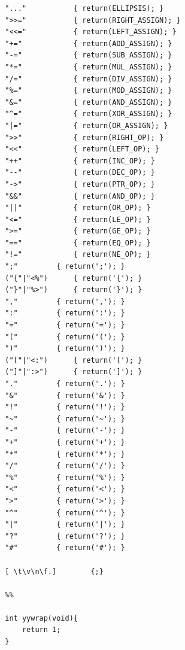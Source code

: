 \documentclass{article}
\begin{document}
\begin{lstlisting}
		"..."			{ return(ELLIPSIS); }
		">>="			{ return(RIGHT_ASSIGN); }
		"<<="			{ return(LEFT_ASSIGN); }
		"+="			{ return(ADD_ASSIGN); }
		"-="			{ return(SUB_ASSIGN); }
		"*="			{ return(MUL_ASSIGN); }
		"/="			{ return(DIV_ASSIGN); }
		"%="			{ return(MOD_ASSIGN); }
		"&="			{ return(AND_ASSIGN); }
		"^="			{ return(XOR_ASSIGN); }
		"|="			{ return(OR_ASSIGN); }
		">>"			{ return(RIGHT_OP); }
		"<<"			{ return(LEFT_OP); }
		"++"			{ return(INC_OP); }
		"--"			{ return(DEC_OP); }
		"->"			{ return(PTR_OP); }
		"&&"			{ return(AND_OP); }
		"||"			{ return(OR_OP); }
		"<="			{ return(LE_OP); }
		">="			{ return(GE_OP); }
		"=="			{ return(EQ_OP); }
		"!="			{ return(NE_OP); }
		";"			{ return(';'); }
		("{"|"<%")		{ return('{'); }
		("}"|"%>")		{ return('}'); }
		","			{ return(','); }
		":"			{ return(':'); }
		"="			{ return('='); }
		"("			{ return('('); }
		")"			{ return(')'); }
		("["|"<:")		{ return('['); }
		("]"|":>")		{ return(']'); }
		"."			{ return('.'); }
		"&"			{ return('&'); }
		"!"			{ return('!'); }
		"~"			{ return('~'); }
		"-"			{ return('-'); }
		"+"			{ return('+'); }
		"*"			{ return('*'); }
		"/"			{ return('/'); }
		"%"			{ return('%'); }
		"<"			{ return('<'); }
		">"			{ return('>'); }
		"^"			{ return('^'); }
		"|"			{ return('|'); }
		"?"			{ return('?'); }
		"#"			{ return('#'); }
		
		[ \t\v\n\f.]		{;}
		
		%%
		
		int yywrap(void){
			return 1;
		}
\end{lstlisting}

\newpage
\end{document}
